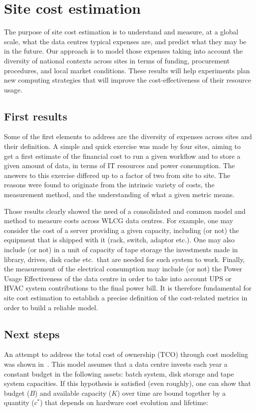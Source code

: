 \section{Site cost estimation}
The purpose of site cost estimation is to understand and measure, at a
global scale, what the data centres typical expenses are, and predict
what they may be in the future. Our approach is to model those
expenses taking into account the diversity of national contexts
across sites in terms of funding, procurement procedures, and local
market conditions.  These results will help experiments plan new
computing strategies that will improve the cost-effectiveness of their
resource usage.

\subsection{First results}
Some of the first elements to address are the diversity of expenses
across sites and their definition.  A simple and quick exercise was
made by four sites, aiming to get a first estimate of the financial
cost to run a given workflow and to store a given amount of data, in
terms of IT resources and power consumption.  The answers to this
exercise differed up to a factor of two from site to site.
The reasons were found to originate from the intrinsic variety of
costs, the measurement method, and the understanding of what a given
metric means.

Those results clearly showed the need of a consolidated and common
model and method to measure costs across WLCG data centres. For
example, one may consider the cost of a server providing a given
capacity, including (or not) the equipment that is shipped with it
(rack, switch, adaptor etc.).  One may also include (or not) in a unit
of capacity of tape storage the investments made in library, drives,
disk cache etc.\ that are needed for such system to work.  Finally,
the measurement of the electrical consumption may include (or not) the
Power Usage Effectiveness of the data centre in order to take into
account UPS or HVAC system contributions to the final power bill.  It
is therefore fundamental for site cost estimation to establish a
precise definition of the cost-related metrics in order to build a
reliable model.

\subsection{Next steps}
An attempt to address the total cost of ownership (TCO)
through cost modeling was shown in~\cite{costmodel}. This model
assumes that a data centre invests each year a constant budget in the
following assets: batch system, disk storage and tape system
capacities. If this hypothesis is satisfied (even roughly), one can
show that budget ($B$) and available capacity ($K$) over time are
bound together by a quantity ($c^*$) that depends on hardware cost
evolution and lifetime:

